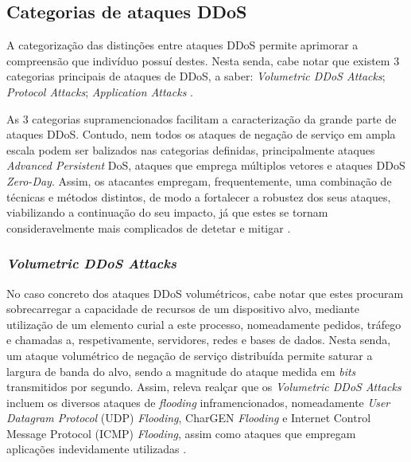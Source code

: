 \subsection{Categorias de ataques DDoS}
A categorização das distinções entre ataques DDoS permite aprimorar a compreensão que indivíduo possuí destes. Nesta senda, cabe notar que existem 3 categorias principais de ataques de DDoS, a saber: \textit{Volumetric DDoS Attacks}; \textit{Protocol Attacks}; \textit{Application Attacks} \cite{esecurityplanet_types_of_ddos_attacks,connectwise_types_of_ddos_attacks}.

As 3 categorias supramencionados facilitam a caracterização da grande parte de ataques DDoS. Contudo, nem todos os ataques de negação de serviço em ampla escala podem ser balizados nas categorias definidas, principalmente ataques \textit{Advanced Persistent} DoS, ataques que emprega múltiplos vetores e ataques DDoS \textit{Zero-Day}. Assim, os atacantes empregam, frequentemente, uma combinação de técnicas e métodos distintos, de modo a fortalecer a robustez dos seus ataques, viabilizando a continuação do seu impacto, já que estes se tornam consideravelmente mais complicados de detetar e mitigar \cite{esecurityplanet_types_of_ddos_attacks,connectwise_types_of_ddos_attacks}.

\subsubsection{\textit{Volumetric DDoS Attacks}}

No caso concreto dos ataques DDoS volumétricos, cabe notar que estes procuram sobrecarregar a capacidade de recursos de um dispositivo alvo, mediante utilização de um elemento curial a este processo, nomeadamente pedidos, tráfego e chamadas a, respetivamente, servidores, redes e bases de dados. Nesta senda, um ataque volumétrico de negação de serviço distribuída permite saturar a largura de banda do alvo, sendo a magnitude do ataque medida em \textit{bits} transmitidos por segundo. Assim, releva realçar que os \textit{Volumetric DDoS Attacks} incluem os diversos ataques de \textit{flooding} inframencionados, nomeadamente \textit{User Datagram Protocol} (UDP) \textit{Flooding}, CharGEN \textit{Flooding} e Internet Control Message Protocol (ICMP) \textit{Flooding}, assim como ataques que empregam aplicações indevidamente utilizadas \cite{esecurityplanet_types_of_ddos_attacks}.

